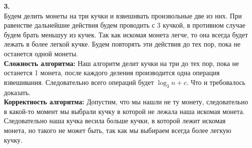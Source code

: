 \documentclass[a4paper,12pt]{article}
\begin{document}
\textbf{3.}\\
Будем делить монеты на три кучки и взвешивать произвольные две из них. При равенстве дальнейшие действия будем проводить с 3 кучкой, в противном случае будем брать меньшуу из кучек. Так как искомая монета легче, то она всегда будет лежать в более легкой кучке. Будем повторять эти действия до тех пор, пока не останется одной монеты. \\
\textbf{Сложность алгоритма:} Наш алгоритм делит кучки на три до тех пор, пока не останется 1 монета, после каждого деления производится одна операция взвешивания. Следовательно всего операций будет $\log_3 n + c$. Что и требовалось доказать.\\
\textbf{Корректность алгоритма:} Допустим, что мы нашли не ту монету, следовательно в какой-то момент мы выбрали кучку в которой не лежала наша искомая монета. Следовательно наша кучка весила больше кучки, в которой лежит искомая монета, но такого не может быть, так как мы выбираем всегда более легкую кучку.
\end{document}
